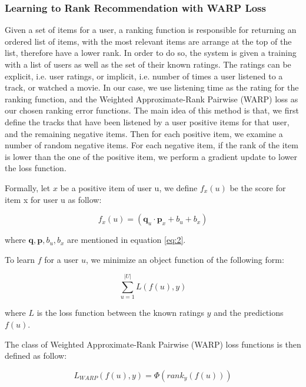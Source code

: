 \subsubsection{Learning to Rank Recommendation with WARP Loss}
Given a set of items for a user, a ranking function is responsible for returning an ordered list of items, with the most relevant items are arrange at the top of the list, therefore have a lower rank. In order to do so, the system is given a training with a list of users as well as the set of their known ratings. The ratings can be explicit, i.e. user ratings, or implicit, i.e. number of times a user listened to a track, or watched a movie. In our case, we use listening time as the rating for the ranking function, and the Weighted Approximate-Rank Pairwise (WARP) loss \cite{weston2011wsabie} as our chosen ranking error functions. The main idea of this method is that, we first define the tracks that have been listened by a user positive items for that user, and the remaining negative items. Then for each positive item, we examine a number of random negative items. For each negative item, if the rank of the item is lower than the one of the positive item, we perform a gradient update to lower the loss function. \hfill \break

\noindent Formally, let \(x\) be a positive item of user u, we define \( f_x(u) \) be the score for item x for user u as follow:

\begin{displaymath}
f_x(u) =  (\boldsymbol{q}_u \cdot \boldsymbol{p}_x + b_u + b_x) 
\end{displaymath}

\noindent where \(\boldsymbol{q}, \boldsymbol{p}, b_u, b_x\) are mentioned in equation \eqref{eq:2}. \hfill \break
 
\noindent To learn \(f\) for a user \(u\), we minimize an object function of the following form:

\begin{displaymath}
\sum_{u=1}^{\lvert U \rvert} L\left(f(u), y\right) \tag{3} \label{eq:3}
\end{displaymath}

\noindent where \(L\) is the loss function between the known ratings \(y\) and the predictions \(f(u)\).  \hfill \break

\noindent The class of Weighted Approximate-Rank Pairwise (WARP) loss functions is then defined as follow:

\begin{displaymath}
L_{WARP}(f(u), y) =  \Phi \left(rank_y(f(u))\right)   \tag{4} \label{eq:4}
\end{displaymath}

